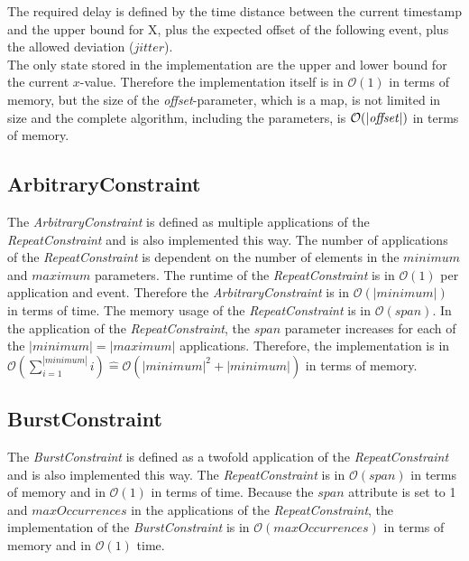 	The required delay is defined by the time distance between the current timestamp and the upper bound for X, plus the expected offset of the following event, plus the allowed deviation ($jitter$).\\
	The only state stored in the implementation are the upper and lower bound for the  current $x$-value. Therefore the implementation itself is in $\mathcal{O}(1)$ in terms of memory, but the size of the \textit{offset}-parameter, which is a map, is not limited in size and the complete algorithm, including the parameters, is $\mathcal{O}(|\text{\textit{offset}}|)$ in terms of memory.
	
\subsection{ArbitraryConstraint}
	The \emph{ArbitraryConstraint} is defined as multiple applications of the \emph{RepeatConstraint} and is also implemented this way. The number of applications of the \emph{RepeatConstraint} is dependent on the number of elements in the $minimum$ and $maximum$ parameters. The runtime of the \emph{RepeatConstraint} is in $\mathcal{O}(1)$ per application and event. Therefore the \emph{ArbitraryConstraint} is in $\mathcal{O}(|minimum|)$ in terms of time. The memory usage of the \emph{RepeatConstraint} is in $\mathcal{O}(span)$. In the application of the \emph{RepeatConstraint}, the $span$ parameter increases for each of the $|minimum| = |maximum|$ applications. Therefore, the implementation is in $\mathcal{O}(\sum_{i=1}^{|minimum|}i)\widehat{=}\mathcal{O}(|minimum|^2+|minimum|)$ in terms of memory.

\subsection{BurstConstraint}
	The \textit{BurstConstraint} is defined as a twofold application of the \emph{RepeatConstraint} and is also implemented this way. The \textit{RepeatConstraint} is in $\mathcal{O}(span)$ in terms of memory and in $\mathcal{O}(1)$ in terms of time. Because the $span$ attribute is set to 1 and $maxOccurrences$ in the applications of the \textit{RepeatConstraint}, the implementation of the \emph{BurstConstraint} is in $\mathcal{O}(maxOccurrences)$ in terms of memory and in $\mathcal{O}(1)$ time.


